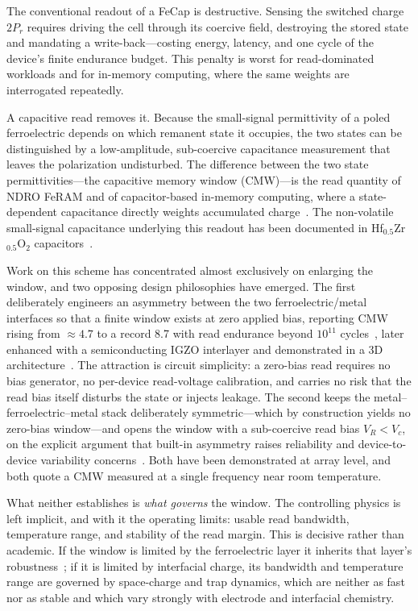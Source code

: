 \documentclass[journal]{IEEEtran}
\newcommand{\hzo}{Hf$_{0.5}$Zr$_{0.5}$O$_{2}$}
\begin{document}
The conventional readout of a FeCap is destructive. Sensing the switched
charge $2P_r$ requires driving the cell through its coercive field,
destroying the stored state and mandating a write-back---costing energy,
latency, and one cycle of the device's finite endurance budget. This penalty
is worst for read-dominated workloads and for in-memory computing, where the
same weights are interrogated repeatedly.

A capacitive read removes it. Because the small-signal permittivity of a
poled ferroelectric depends on which remanent state it occupies, the two
states can be distinguished by a low-amplitude, sub-coercive capacitance
measurement that leaves the polarization undisturbed. The difference between
the two state permittivities---the capacitive memory window (CMW)---is the
read quantity of NDRO FeRAM and of capacitor-based in-memory computing, where
a state-dependent capacitance directly weights accumulated
charge~\cite{mukherjee2023edl,mukherjee2023iedm,mukherjee2024iedm,lee2025aem}.
The non-volatile small-signal capacitance underlying this readout has been
documented in \hzo{} capacitors~\cite{luo2020}.

Work on this scheme has concentrated almost exclusively on enlarging the
window, and two opposing design philosophies have emerged. The first
deliberately engineers an asymmetry between the two ferroelectric/metal
interfaces so that a finite window exists at zero applied bias, reporting CMW
rising from $\approx 4.7$ to a record 8.7 with read endurance beyond
$10^{11}$ cycles~\cite{mukherjee2023edl,mukherjee2023iedm}, later enhanced
with a semiconducting IGZO interlayer and demonstrated in a 3D
architecture~\cite{mukherjee2024iedm,mukherjee2025edl}. The attraction is
circuit simplicity: a zero-bias read requires no bias generator, no
per-device read-voltage calibration, and carries no risk that the read bias
itself disturbs the state or injects leakage. The second keeps the
metal--ferroelectric--metal stack deliberately symmetric---which by
construction yields no zero-bias window---and opens the window with a
sub-coercive read bias $V_R < V_c$, on the explicit argument that built-in
asymmetry raises reliability and device-to-device variability
concerns~\cite{lee2025aem}. Both have been demonstrated at array level, and
both quote a CMW measured at a single frequency near room temperature.

What neither establishes is \emph{what governs} the window. The controlling
physics is left implicit, and with it the operating limits: usable read
bandwidth, temperature range, and stability of the read margin. This is
decisive rather than academic. If the window is limited by the ferroelectric
layer it inherits that layer's
robustness~\cite{pesic2016,schenk2014,grimley2016}; if it is limited by
interfacial charge, its bandwidth and temperature range are governed by
space-charge and trap dynamics, which are neither as fast nor as stable and
which vary strongly with electrode and interfacial chemistry.
\end{document}
